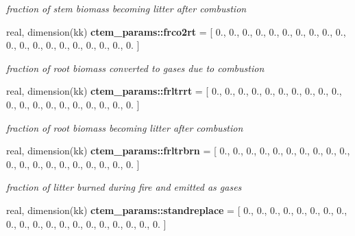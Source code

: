\begin{DoxyCompactItemize}
\begin{DoxyCompactList}\small\item\em fraction of stem biomass becoming litter after combustion \end{DoxyCompactList}\item 
\hypertarget{namespacectem__params_ac11f9cbbf331e0bb6bbb5a675fdc4543}{}real, dimension(kk) {\bfseries ctem\+\_\+params\+::frco2rt} = \mbox{[} 0., 0., 0., 0., 0., 0., 0., 0., 0., 0., 0., 0., 0., 0., 0., 0., 0., 0., 0., 0. \mbox{]}\label{namespacectem__params_ac11f9cbbf331e0bb6bbb5a675fdc4543}

\begin{DoxyCompactList}\small\item\em fraction of root biomass converted to gases due to combustion \end{DoxyCompactList}\item 
\hypertarget{namespacectem__params_a6081b9662214fa2aa63c3080fc1868ae}{}real, dimension(kk) {\bfseries ctem\+\_\+params\+::frltrrt} = \mbox{[} 0., 0., 0., 0., 0., 0., 0., 0., 0., 0., 0., 0., 0., 0., 0., 0., 0., 0., 0., 0. \mbox{]}\label{namespacectem__params_a6081b9662214fa2aa63c3080fc1868ae}

\begin{DoxyCompactList}\small\item\em fraction of root biomass becoming litter after combustion \end{DoxyCompactList}\item 
\hypertarget{namespacectem__params_a7f36ae05e8efb516582037530650eac9}{}real, dimension(kk) {\bfseries ctem\+\_\+params\+::frltrbrn} = \mbox{[} 0., 0., 0., 0., 0., 0., 0., 0., 0., 0., 0., 0., 0., 0., 0., 0., 0., 0., 0., 0. \mbox{]}\label{namespacectem__params_a7f36ae05e8efb516582037530650eac9}

\begin{DoxyCompactList}\small\item\em fraction of litter burned during fire and emitted as gases \end{DoxyCompactList}\item 
\hypertarget{namespacectem__params_a5086cd6fb3b85a2882e7aa2683598f9b}{}real, dimension(kk) {\bfseries ctem\+\_\+params\+::standreplace} = \mbox{[} 0., 0., 0., 0., 0., 0., 0., 0., 0., 0., 0., 0., 0., 0., 0., 0., 0., 0., 0., 0. \mbox{]}\label{namespacectem__params_a5086cd6fb3b85a2882e7aa2683598f9b}


\end{DoxyCompactItemize}

